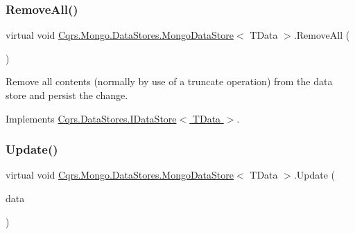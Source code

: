 \mbox{\label{classCqrs_1_1Mongo_1_1DataStores_1_1MongoDataStore_a878966ea796321cae54c3c619e3178d5_a878966ea796321cae54c3c619e3178d5}} 
\subsubsection{\texorpdfstring{Remove\+All()}{RemoveAll()}}
{\footnotesize\ttfamily virtual void \hyperlink{classCqrs_1_1Mongo_1_1DataStores_1_1MongoDataStore}{Cqrs.\+Mongo.\+Data\+Stores.\+Mongo\+Data\+Store}$<$ T\+Data $>$.Remove\+All (\begin{DoxyParamCaption}{ }\end{DoxyParamCaption})\hspace{0.3cm}{\ttfamily [virtual]}}



Remove all contents (normally by use of a truncate operation) from the data store and persist the change. 



Implements \hyperlink{interfaceCqrs_1_1DataStores_1_1IDataStore_aead8d7a39a717d29af05daf7b64bea94_aead8d7a39a717d29af05daf7b64bea94}{Cqrs.\+Data\+Stores.\+I\+Data\+Store$<$ T\+Data $>$}.

\mbox{\label{classCqrs_1_1Mongo_1_1DataStores_1_1MongoDataStore_a03aac0495445d34f124db893cd09cbd8_a03aac0495445d34f124db893cd09cbd8}} 
\subsubsection{\texorpdfstring{Update()}{Update()}}
{\footnotesize\ttfamily virtual void \hyperlink{classCqrs_1_1Mongo_1_1DataStores_1_1MongoDataStore}{Cqrs.\+Mongo.\+Data\+Stores.\+Mongo\+Data\+Store}$<$ T\+Data $>$.Update (\begin{DoxyParamCaption}\item[{T\+Data}]{data }\end{DoxyParamCaption})\hspace{0.3cm}{\ttfamily [virtual]}}



